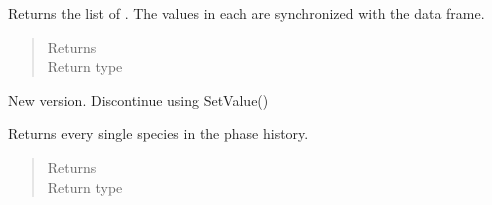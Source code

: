 \documentclass[letterpaper,10pt,openany,oneside,english]{sphinxmanual}
\begin{document}
\begin{fulllineitems}
\begin{fulllineitems}
\begin{quote}
\begin{description}
\end{description}\end{quote}

\end{fulllineitems}


\begin{fulllineitems}
\label{\detokenize{support_rst/phase:phase.Phase.quantities}}
Returns the list of . The values in each  are
synchronized with the  data frame.
\begin{quote}\begin{description}
\item[{Returns}] \leavevmode
{}

\item[{Return type}] \leavevmode
{}

\end{description}\end{quote}

\end{fulllineitems}


\begin{fulllineitems}
\label{\detokenize{support_rst/phase:phase.Phase.set_value}}
New version. Discontinue using SetValue()

\end{fulllineitems}


\begin{fulllineitems}
\label{\detokenize{support_rst/phase:phase.Phase.species}}
Returns every single species in the phase history.
\begin{quote}\begin{description}
\item[{Returns}] \leavevmode
{}

\item[{Return type}] \leavevmode
{}


\end{description}
\end{quote}
\end{fulllineitems}
\end{fulllineitems}
\end{document}
